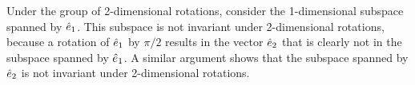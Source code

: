 \begin{example}
    Under the group of 2-dimensional rotations, consider the 1-dimensional subspace spanned by $\hat{e}_1$. This subspace is not invariant under 2-dimensional rotations, because a rotation of $\hat{e}_1$ by $\pi/2$ results in the vector $\hat{e}_2$ that is clearly not in the subspace spanned by $\hat{e}_1$. A similar argument shows that the subspace spanned by $\hat{e}_2$ is not invariant under 2-dimensional rotations.



\end{example}
